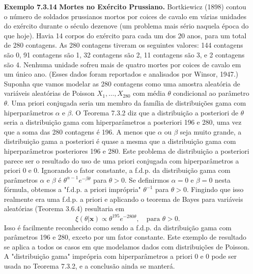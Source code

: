 \vspace{1cm}
\noindent\textbf{Exemplo 7.3.14} \quad \textbf{Mortes no Exército Prussiano.} Bortkiewicz (1898) contou o número de soldados prussianos mortos por coices de cavalo em várias unidades do exército durante o século dezenove (um problema mais sério naquela época do que hoje). Havia 14 corpos do exército para cada um dos 20 anos, para um total de 280 contagens. As 280 contagens tiveram os seguintes valores: 144 contagens são 0, 91 contagens são 1, 32 contagens são 2, 11 contagens são 3, e 2 contagens são 4. Nenhuma unidade sofreu mais de quatro mortes por coices de cavalo em um único ano. (Esses dados foram reportados e analisados por Winsor, 1947.) Suponha que vamos modelar as 280 contagens como uma amostra aleatória de variáveis aleatórias de Poisson $X_1, \dots, X_{280}$ com média $\theta$ condicional ao parâmetro $\theta$. Uma priori conjugada seria um membro da família de distribuições gama com hiperparâmetros $\alpha$ e $\beta$. O Teorema 7.3.2 diz que a distribuição a posteriori de $\theta$ seria a distribuição gama com hiperparâmetros a posteriori 196 e 280, uma vez que a soma das 280 contagens é 196. A menos que $\alpha$ ou $\beta$ seja muito grande, a distribuição gama a posteriori é quase a mesma que a distribuição gama com hiperparâmetros posteriores 196 e 280. Este problema de distribuição a posteriori parece ser o resultado do uso de uma priori conjugada com hiperparâmetros a priori 0 e 0. Ignorando o fator constante, a f.d.p. da distribuição gama com parâmetros $\alpha$ e $\beta$ é $\theta^{\alpha-1}e^{-\beta\theta}$ para $\theta>0$. Se definirmos $\alpha=0$ e $\beta=0$ nesta fórmula, obtemos a "f.d.p. a priori imprópria" $\theta^{-1}$ para $\theta>0$. Fingindo que isso realmente era uma f.d.p. a priori e aplicando o teorema de Bayes para variáveis aleatórias (Teorema 3.6.4) resultaria em
$$ \xi(\theta|\mathbf{x}) \propto \theta^{195} e^{-280\theta}, \quad \text{para } \theta>0. $$
Isso é facilmente reconhecido como sendo a f.d.p. da distribuição gama com parâmetros 196 e 280, exceto por um fator constante. Este exemplo de resultado se aplica a todos os casos em que modelamos dados com distribuições de Poisson. A "distribuição gama" imprópria com hiperparâmetros a priori 0 e 0 pode ser usada no Teorema 7.3.2, e a conclusão ainda se manterá.

